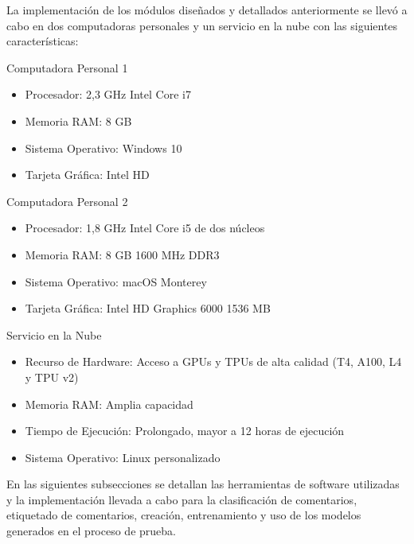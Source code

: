 La implementación de los módulos diseñados y detallados anteriormente se llevó a cabo en dos computadoras personales y un servicio en la nube con las siguientes características:

Computadora Personal 1

\begin{itemize}

\item Procesador: 2,3 GHz Intel Core i7 
\item Memoria RAM: 8 GB
\item Sistema Operativo: Windows 10
\item Tarjeta Gráfica: Intel HD 

\end{itemize}

Computadora Personal 2

\begin{itemize}

\item Procesador: 1,8 GHz Intel Core i5 de dos núcleos
\item Memoria RAM: 8 GB 1600 MHz DDR3
\item Sistema Operativo: macOS Monterey
\item Tarjeta Gráfica: Intel HD Graphics 6000 1536 MB

\end{itemize}

Servicio en la Nube

\begin{itemize}

\item Recurso de Hardware: Acceso a GPUs y TPUs de alta calidad (T4, A100, L4 y TPU v2)
\item Memoria RAM: Amplia capacidad
\item Tiempo de Ejecución: Prolongado, mayor a 12 horas de ejecución
\item Sistema Operativo: Linux personalizado

\end{itemize}

En las siguientes subsecciones se detallan las herramientas de software utilizadas y la implementación llevada a cabo para la clasificación de comentarios, etiquetado de comentarios, creación, entrenamiento y uso de los modelos generados en el proceso de prueba.

